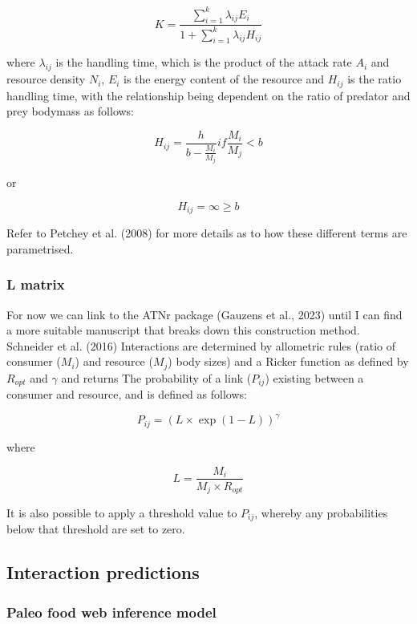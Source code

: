 \documentclass[
]{article}
\begin{document}
\[
K = \frac{\sum_{i=1}^{k}\lambda_{ij}E_{i}}{1+\sum_{i=1}^{k}\lambda_{ij}H_{ij}}
\]

where \(\lambda_{ij}\) is the handling time, which is the product of the
attack rate \(A_{i}\) and resource density \(N_{i}\), \(E_{i}\) is the
energy content of the resource and \(H_{ij}\) is the ratio handling
time, with the relationship being dependent on the ratio of predator and
prey bodymass as follows:

\[
H_{ij} = \frac{h}{b - \frac{M_{i}}{M_{j}}} if \frac{M_{i}}{M_{j}} < b
\]

or

\[
H_{ij} = \infty \geq b
\]

Refer to Petchey et al. (2008) for more details as to how these
different terms are parametrised.

\subsubsection{L matrix}\label{l-matrix}

For now we can link to the ATNr package (Gauzens et al., 2023) until I
can find a more suitable manuscript that breaks down this construction
method. Schneider et al. (2016) Interactions are determined by
allometric rules (ratio of consumer (\(M_{i}\)) and resource (\(M_{j}\))
body sizes) and a Ricker function as defined by \(R_{opt}\) and
\(\gamma\) and returns The probability of a link (\(P_{ij}\)) existing
between a consumer and resource, and is defined as follows:

\[
P_{ij} = (L \times \exp(1 - L))^{\gamma}
\]

where

\[
L = \frac{M_{i}}{M_{j} \times R_{opt}}
\]

It is also possible to apply a threshold value to \(P_{ij}\), whereby
any probabilities below that threshold are set to zero.

\subsection{Interaction predictions}\label{interaction-predictions}

\subsubsection{Paleo food web inference
model}\label{paleo-food-web-inference-model}
\end{document}
